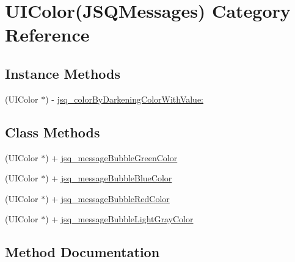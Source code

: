 \hypertarget{category_u_i_color_07_j_s_q_messages_08}{}\section{U\+I\+Color(J\+S\+Q\+Messages) Category Reference}
\label{category_u_i_color_07_j_s_q_messages_08}
\subsection*{Instance Methods}
\begin{DoxyCompactItemize}
\item 
(U\+I\+Color $\ast$) -\/ \hyperlink{category_u_i_color_07_j_s_q_messages_08_a66cc769b14b88a972f5ccafdd2666160}{jsq\+\_\+color\+By\+Darkening\+Color\+With\+Value\+:}
\end{DoxyCompactItemize}
\subsection*{Class Methods}
\begin{DoxyCompactItemize}
\item 
(U\+I\+Color $\ast$) + \hyperlink{category_u_i_color_07_j_s_q_messages_08_a218e1ef39da688c442f462aad4716be7}{jsq\+\_\+message\+Bubble\+Green\+Color}
\item 
(U\+I\+Color $\ast$) + \hyperlink{category_u_i_color_07_j_s_q_messages_08_a00642626d968975b4b8757e9a04dc89f}{jsq\+\_\+message\+Bubble\+Blue\+Color}
\item 
(U\+I\+Color $\ast$) + \hyperlink{category_u_i_color_07_j_s_q_messages_08_a6bcc11d93bf8cb2f1b06ec1eeb1484b6}{jsq\+\_\+message\+Bubble\+Red\+Color}
\item 
(U\+I\+Color $\ast$) + \hyperlink{category_u_i_color_07_j_s_q_messages_08_a4df05b7ccbbe36557f2e7f9d54d4a3b4}{jsq\+\_\+message\+Bubble\+Light\+Gray\+Color}
\end{DoxyCompactItemize}


\subsection{Method Documentation}
\hypertarget{category_u_i_color_07_j_s_q_messages_08_a66cc769b14b88a972f5ccafdd2666160}{}
